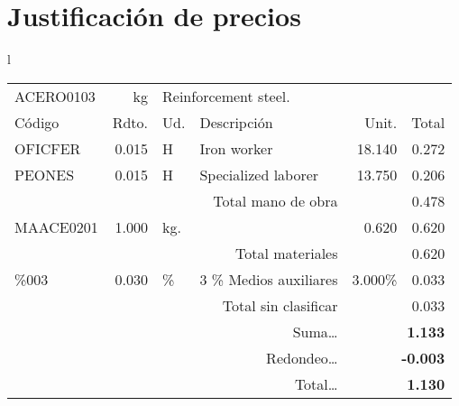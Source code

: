\documentclass{book}%
\begin{document}
%
\normalsize%
\part{Justificación de precios}%
\label{sec:Justificacindeprecios}%
\small%
\begin{longtable}{l}%
\begin{tabular}{l r l p{4cm} r r}%
ACERO0103&kg&\multicolumn{4}{p{7cm}}{Reinforcement steel.}\\%
Código&Rdto.&Ud.&Descripción&Unit.&Total\\%
\hline%
OFICFER&0.015&H&Iron worker&18.140&0.272\\%
PEONES&0.015&H&Specialized laborer&13.750&0.206\\%
\multicolumn{4}{r}{Total mano de obra}&&0.478\\%
MAACE0201&1.000&kg.&&0.620&0.620\\%
\multicolumn{4}{r}{Total materiales}&&0.620\\%
\%003&0.030&\%&3 \% Medios auxiliares&3.000\%&0.033\\%
\multicolumn{4}{r}{Total sin clasificar}&&0.033\\%
\multicolumn{4}{r}{Suma\ldots}&\multicolumn{2}{r}{\textbf{1.133}}\\%
\multicolumn{4}{r}{Redondeo\ldots}&\multicolumn{2}{r}{\textbf{{-}0.003}}\\%
\multicolumn{4}{r}{Total\ldots}&\multicolumn{2}{r}{\textbf{1.130}}\\%
\end{tabular}\\%
\end{longtable}%
\normalsize

%
\end{document}
